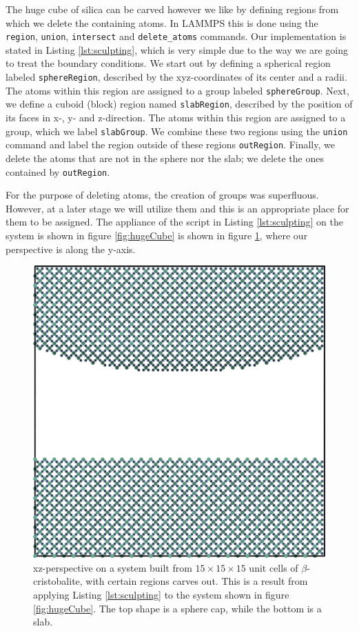 \documentclass[twoside,english]{uiofysmaster}
\begin{document}
The huge cube of silica can be carved however we like by defining regions from which we delete the containing atoms. 
In LAMMPS this is done using the \texttt{region}, \texttt{union}, \texttt{intersect} and \texttt{delete\_atoms} commands. 
Our implementation is stated in Listing \ref{lst:sculpting}, which is very simple due to the way we are going to treat the boundary conditions. 
We start out by defining a spherical region labeled \texttt{sphereRegion}, described by the xyz-coordinates of its center and a radii. 
The atoms within this region are assigned to a group labeled \texttt{sphereGroup}. 
Next, we define a cuboid (block) region named \texttt{slabRegion}, described by the position of its faces in x-, y- and z-direction. 
The atoms within this region are assigned to a group, which we label \texttt{slabGroup}.  
We combine these two regions using  the \texttt{union} command and label the region outside of these regions \texttt{outRegion}.
Finally, we delete the atoms that are not in the sphere nor the slab; we delete the ones contained by \texttt{outRegion}.

For the purpose of deleting atoms, the creation of groups was superfluous.
However, at a later stage we will utilize them and this is an appropriate place for them to be assigned. 
The appliance of the script in Listing \ref{lst:sculpting} on the system is shown in figure \ref{fig:hugeCube} is shown in figure \ref{fig:carvedxz}, where our perspective is along the y-axis.
\begin{figure}[H]
\centering
\includegraphics[width=0.5\linewidth]{figures/CreatingSystem/carved_xz.png}
\caption{xz-perspective on a system built from $15\times15\times15$ unit cells of $\beta$-cristobalite, with certain regions carves out. This is a result from applying Listing \ref{lst:sculpting} to the system shown in figure \ref{fig:hugeCube}. The top shape is a sphere cap, while the bottom is a slab.}
\label{fig:carvedxz}
\end{figure}
\end{document}
